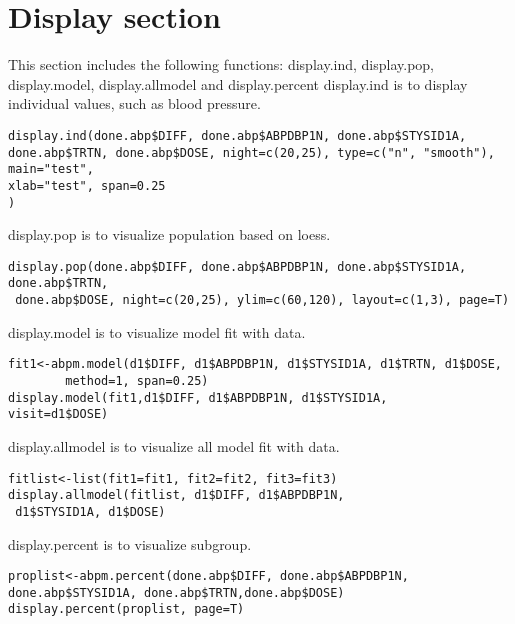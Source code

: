 \documentclass[a4paper]{article}
\begin{document}
\section{Display section}
This section includes the following functions:
display.ind, display.pop, display.model, display.allmodel and display.percent
\newline
\newline
display.ind is to display individual values, such as blood pressure.
\begin{verbatim}
display.ind(done.abp$DIFF, done.abp$ABPDBP1N, done.abp$STYSID1A, 
done.abp$TRTN, done.abp$DOSE, night=c(20,25), type=c("n", "smooth"), main="test",
xlab="test", span=0.25
)
\end{verbatim}
display.pop is to visualize population based on loess.
\begin{verbatim}
display.pop(done.abp$DIFF, done.abp$ABPDBP1N, done.abp$STYSID1A, done.abp$TRTN, 
 done.abp$DOSE, night=c(20,25), ylim=c(60,120), layout=c(1,3), page=T)

\end{verbatim}
display.model is to visualize model fit with data.
\begin{verbatim}
fit1<-abpm.model(d1$DIFF, d1$ABPDBP1N, d1$STYSID1A, d1$TRTN, d1$DOSE, 
		method=1, span=0.25)
display.model(fit1,d1$DIFF, d1$ABPDBP1N, d1$STYSID1A,
visit=d1$DOSE)
\end{verbatim}
display.allmodel is to visualize all model fit with data.
\begin{verbatim}
fitlist<-list(fit1=fit1, fit2=fit2, fit3=fit3)
display.allmodel(fitlist, d1$DIFF, d1$ABPDBP1N,
 d1$STYSID1A, d1$DOSE)
\end{verbatim}

display.percent is to visualize subgroup.
\begin{verbatim}
proplist<-abpm.percent(done.abp$DIFF, done.abp$ABPDBP1N, done.abp$STYSID1A, done.abp$TRTN,done.abp$DOSE)
display.percent(proplist, page=T)

\end{verbatim}


 
\end{document}
